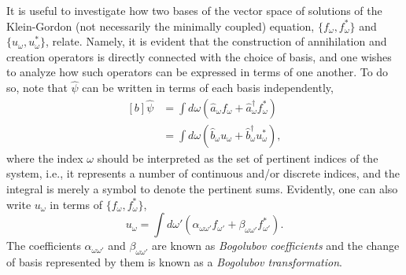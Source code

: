 \documentclass[
12pt,		%
openright,	%
twoside,  %
a4paper,			%
chapter=TITLE,		%
english,			%
french,				%
spanish,			%
brazil				%
]{USPSC-classe/USPSC}
\begin{document}
It is useful to investigate how two bases of the vector space of solutions of the Klein-Gordon (not necessarily the minimally coupled) equation, $\{f_{\omega},f_{\omega}^*\}$ and $\{u_{\omega},u_{\omega}^*\}$, relate. Namely, it is evident that the construction of annihilation and creation operators is directly connected with the choice of basis, and one wishes to analyze how such operators can be expressed in terms of one another. To do so, note that $\hat{\psi}$ can be written in terms of each basis independently, 
\begin{equation}
\begin{aligned}[b]
    \hat{\psi} & =\int d\omega(\hat{a}_{\omega}f_{\omega}+\hat{a}^{\dag}_{\omega}f_{\omega}^*)\\
    & =\int d\omega(\hat{b}_{\omega}u_{\omega}+\hat{b}^{\dag}_{\omega}u_{\omega}^*),
\end{aligned}
\end{equation}
where the index $\omega$ should be interpreted as the set of pertinent indices of the system, i.e., it represents a number of continuous and/or discrete indices, and the integral is merely a symbol to denote the pertinent sums. Evidently, one can also write $u_{\omega}$ in terms of $\{f_{\omega},f_{\omega}^*\}$,
\begin{equation}\label{bogo}
u_{\omega}=\int d\omega'(\alpha_{\omega\omega'}f_{\omega'}+\beta_{\omega\omega'}f_{\omega'}^*).
\end{equation}
The coefficients $\alpha_{\omega\omega'}$ and $\beta_{\omega\omega'}$ are known as \textit{Bogolubov coefficients} and the change of basis represented by them is known as a \textit{Bogolubov transformation}. 
\end{document}
